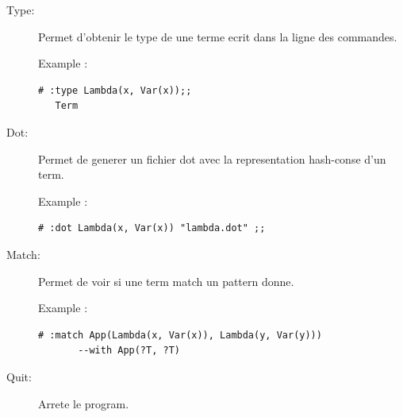\documentclass[12pt,a4paper]{article}
\begin{document}
\begin{description}
\item[Type:]
Permet d'obtenir le type de une terme ecrit dans la ligne des commandes.\\

\begin{minipage}{\textwidth}
Example :
\begin{lstlisting}[basicstyle=\ttfamily\footnotesize]
  # :type Lambda(x, Var(x));;
   Term
\end{lstlisting}
\end{minipage}

\item[Dot:]
Permet de generer un fichier dot avec la representation hash-conse
d'un term. \\

\begin{minipage}{\textwidth}
Example :
\begin{lstlisting}[basicstyle=\ttfamily\footnotesize]
  # :dot Lambda(x, Var(x)) "lambda.dot" ;;
\end{lstlisting}
\end{minipage}

\item[Match:]
Permet de voir si une term match un pattern donne. \\

\begin{minipage}{\textwidth}
Example :
\begin{lstlisting}[basicstyle=\ttfamily\footnotesize]
  # :match App(Lambda(x, Var(x)), Lambda(y, Var(y))) 
       --with App(?T, ?T)
\end{lstlisting}
\end{minipage}

\item[Quit:]
Arrete le program.

\end{description}
\end{document}
